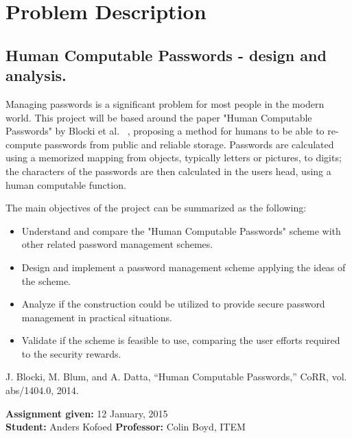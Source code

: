 \chapter*{Problem Description}
\section*{Human Computable Passwords - design and analysis.}
Managing passwords is a significant problem for most people in the modern world. This project will be based around the paper "Human Computable Passwords" by Blocki et al. ~\cite{hcp-blocki}, proposing a method for humans to be able to re-compute passwords from public and reliable storage. Passwords are calculated using a memorized mapping from objects, typically letters or pictures, to digits; the characters of the passwords are then calculated in the users head, using a human computable function.
\par The main objectives of the project can be summarized as the following:

\begin{itemize}
    \item Understand and compare the "Human Computable Passwords" scheme with other related password management schemes.
    \item Design and implement a password management scheme applying the ideas of the scheme.
    \item Analyze if the construction could be utilized to provide secure password management in practical situations.
    \item Validate if the scheme is feasible to use, comparing the user efforts required to the security rewards.

\end{itemize}

\noindent
\cite{hcp-blocki} J. Blocki, M. Blum, and A. Datta, “Human Computable Passwords,” CoRR, vol. abs/1404.0, 2014.

\noindent
\textbf{Assignment given: }12 January, 2015 \\
\textbf{Student: }Anders Kofoed \hfill \textbf{Professor: }Colin Boyd, ITEM \\

